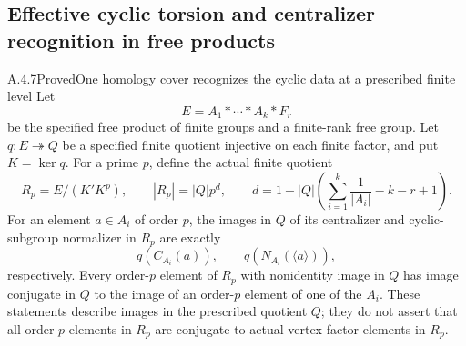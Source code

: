\subsection{Effective cyclic torsion and centralizer recognition in free products}

\begin{result}{A.4.7}{Proved}{One homology cover recognizes the cyclic data at a prescribed finite level}
Let
\[
 E=A_1*\cdots*A_k*F_r
\]
be the specified free product of finite groups and a finite-rank free
group.  Let $q:E\twoheadrightarrow Q$ be a specified finite quotient
injective on each finite factor, and put $K=\ker q$.
For a prime $p$, define the actual finite quotient
\[
 R_p=E/(K'K^p),\qquad
 |R_p|=|Q|p^d,\qquad
 d=1-|Q|\left(\sum_{i=1}^k\frac1{|A_i|}-k-r+1\right).
                                                               \tag{FG.1}
\]
For an element $a\in A_i$ of order $p$, the images in $Q$ of its
centralizer and cyclic-subgroup normalizer in $R_p$ are exactly
\[
 q(C_{A_i}(a)),\qquad q(N_{A_i}(\langle a\rangle)),
                                                               \tag{FG.2}
\]
respectively.  Every order-$p$ element of $R_p$ with nonidentity
image in $Q$ has image conjugate in $Q$ to the image of an
order-$p$ element of one of the $A_i$.
These statements describe images in the prescribed quotient $Q$;
they do not assert that all order-$p$ elements in $R_p$ are
conjugate to actual vertex-factor elements in $R_p$.
\end{result}


